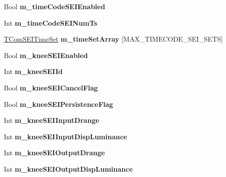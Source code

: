 \begin{DoxyCompactItemize}
Bool {\bfseries m\+\_\+time\+Code\+S\+E\+I\+Enabled}
\item 
\mbox{\label{class_t_enc_cfg_a913248b4ab841bf34daa5294ec72292e}} 
Int {\bfseries m\+\_\+time\+Code\+S\+E\+I\+Num\+Ts}
\item 
\mbox{\label{class_t_enc_cfg_a6fd943341ab99191b5abc5a59a0bef24}} 
\hyperlink{struct_t_com_s_e_i_time_set}{T\+Com\+S\+E\+I\+Time\+Set} {\bfseries m\+\_\+time\+Set\+Array} \mbox{[}M\+A\+X\+\_\+\+T\+I\+M\+E\+C\+O\+D\+E\+\_\+\+S\+E\+I\+\_\+\+S\+E\+TS\mbox{]}
\item 
\mbox{\label{class_t_enc_cfg_ae2a29bd2264c87142361e6add5d52932}} 
Bool {\bfseries m\+\_\+knee\+S\+E\+I\+Enabled}
\item 
\mbox{\label{class_t_enc_cfg_a0945f70783a099e6df7c364664502912}} 
Int {\bfseries m\+\_\+knee\+S\+E\+I\+Id}
\item 
\mbox{\label{class_t_enc_cfg_a5b7441d39c4e662cde73448aeed8c923}} 
Bool {\bfseries m\+\_\+knee\+S\+E\+I\+Cancel\+Flag}
\item 
\mbox{\label{class_t_enc_cfg_a2ad2be2d73d33ece5faa92c23b73fa92}} 
Bool {\bfseries m\+\_\+knee\+S\+E\+I\+Persistence\+Flag}
\item 
\mbox{\label{class_t_enc_cfg_a8d2c5a8a0d39742da0948717102f483b}} 
Int {\bfseries m\+\_\+knee\+S\+E\+I\+Input\+Drange}
\item 
\mbox{\label{class_t_enc_cfg_a66e7533c1ccc7632e27bfbd77dcd25a9}} 
Int {\bfseries m\+\_\+knee\+S\+E\+I\+Input\+Disp\+Luminance}
\item 
\mbox{\label{class_t_enc_cfg_a37a23786282dca96f5ad2dd97e542aa2}} 
Int {\bfseries m\+\_\+knee\+S\+E\+I\+Output\+Drange}
\item 
\mbox{\label{class_t_enc_cfg_a1d93108746583811351555ca5c9313fa}} 
Int {\bfseries m\+\_\+knee\+S\+E\+I\+Output\+Disp\+Luminance}
\item 
\mbox{\label{class_t_enc_cfg_a334846a46b4e547a93033e1c982d2838}} 

\end{DoxyCompactItemize}
